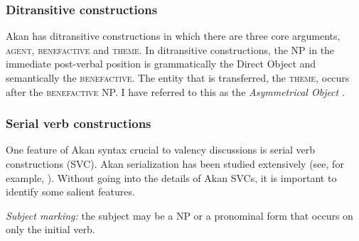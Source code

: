 \documentclass[output=paper]{langsci/langscibook}
\begin{document}
	\z
\z

\subsubsection{Ditransitive constructions}\label{§2.3.3:ditransitive.osam}

Akan has ditransitive constructions in which there are three core arguments, \textsc{agent, benefactive} and \textsc{theme}. In ditransitive constructions, the NP in the immediate post-verbal position is grammatically the Direct Object and semantically the \textsc{benefactive}. The entity that is transferred, the \textsc{theme}, occurs after the \textsc{benefactive} NP. I have referred to this as the \textit{Asymmetrical Object} \citep{osam2000}.

\ea
\label{ex:18.osam}
	\z

	\z
\z


\subsubsection{Serial verb constructions}\label{§2.3.4:serial.osam}

One feature of Akan syntax crucial to valency discussions is serial verb constructions (\textsc{SVC}). Akan serialization has been studied extensively (see, for example, \citealt{lord1973,schachter1974,essilfie1977,forson1990,osam1994a,osam1994b,osam1997,osam2004,osam2014,agyeman2002,hellanetal2003,kambon2012}). Without going into the details of Akan SVCs, it is important to identify some salient features.

\textit{Subject marking:} the subject may be a NP or a pronominal form that occurs on only the initial verb. 
\end{document}

